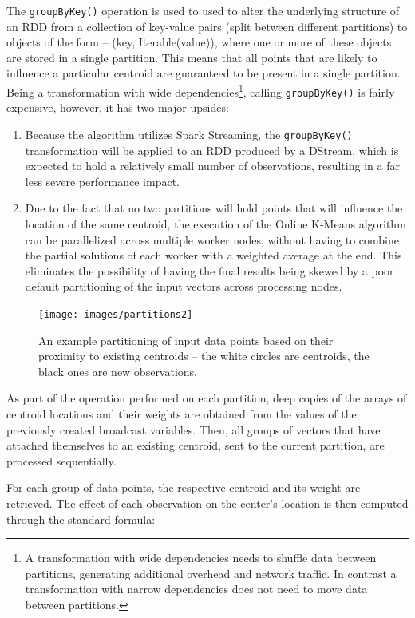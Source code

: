 \documentclass{l4proj}
\begin{document}
The \texttt{groupByKey()} operation is used to used to alter the underlying structure of an RDD from a collection of key-value pairs (split between different partitions) to objects of the form -- (key, Iterable(value)), where one or more of these objects are stored in a single partition. This means that all points that are likely to influence a particular centroid are guaranteed to be present in a single partition. Being a transformation with wide dependencies\footnote{A transformation with wide dependencies needs to shuffle data between partitions, generating additional overhead and network traffic. In contrast a transformation with narrow dependencies does not need to move data between partitions.}, calling \texttt{groupByKey()} is fairly expensive, however, it has two major upsides:

\begin{enumerate}
\item Because the algorithm utilizes Spark Streaming, the \texttt{groupByKey()} transformation will be applied to an RDD produced by a DStream, which is expected to hold a relatively small number of observations, resulting in a far less severe performance impact.
\item Due to the fact that no two partitions will hold points that will influence the location of the same centroid, the execution of the Online K-Means algorithm can be parallelized across multiple worker nodes, without having to combine the partial solutions of each worker with a weighted average at the end. This eliminates the possibility of having the final results being skewed by a poor default partitioning of the input vectors across processing nodes. 
\end{enumerate}

\begin{figure}[H]
	\centering
    \label{partitions2}
    \texttt{[image: images/partitions2]}
    \caption{An example partitioning of input data points based on their proximity to existing centroids -- the white circles are centroids, the black ones are new observations.} 
\end{figure}

As part of the operation performed on each partition, deep copies of the arrays of centroid locations and their weights are obtained from the values of the previously created broadcast variables. Then, all groups of vectors that have attached themselves to an existing centroid, sent to the current partition, are processed sequentially.

For each group of data points, the respective centroid and its weight are retrieved. The effect of each observation on the center's location is then computed through the standard formula:
\end{document}
